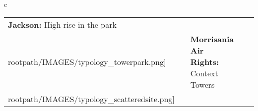 \begin{table}[H]
        \begin{tabular}{c}
        \begin{tabular}{m{1.25in} m{2in} m{.1in} m{1.25in} m{2in}}
\textbf{Jackson:} {High-rise in the park} & \texttt{[image: \\rootpath/IMAGES/typology\_towerpark.png]} & & \textbf{Morrisania Air Rights:} {Context Towers} & \texttt{[image: \\rootpath/IMAGES/typology\_scatteredsite.png]}
\end{tabular}\end{tabular}
        \end{table}